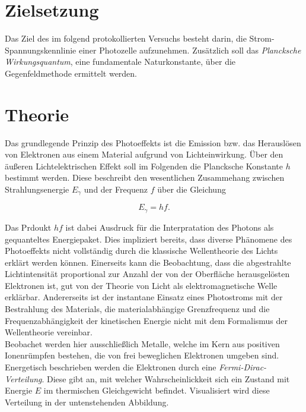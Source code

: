 



\section{Zielsetzung}
\label{sec:Zielsetzung}

Das Ziel des im folgend protokollierten Versuchs besteht darin, die Strom- Spannungskennlinie einer Photozelle aufzunehmen. Zusätzlich soll das \emph{Plancksche
Wirkungsquantum}, eine fundamentale Naturkonstante, über die Gegenfeldmethode ermittelt werden.

\section{Theorie}
\label{sec:Theorie}

Das grundlegende Prinzip des Photoeffekts ist die Emission bzw. das Herauslösen von Elektronen aus einem Material aufgrund von Lichteinwirkung. Über den äußeren 
Lichtelektrischen Effekt soll im Folgenden die Plancksche Konstante $h$ bestimmt werden. Diese beschreibt den wesentlichen Zusammehang zwischen Strahlungsenergie
$E_\gamma$ und der Frequenz $f$ über die Gleichung 

\begin{equation*}
    E_\gamma = hf.
\end{equation*}

\noindent Das Prdoukt $hf$ ist dabei Ausdruck für die Interpratation des Photons als gequanteltes Energiepaket. Dies impliziert bereits, dass diverse Phänomene des 
Photoeffekts nicht vollständig durch die klassische Wellentheorie des Lichts erklärt werden können. Einerseits kann die Beobachtung, dass die abgestrahlte Lichtintensität 
proportional zur Anzahl der von der Oberfläche herausgelösten Elektronen ist, gut von der Theorie von Licht als elektromagnetische Welle erklärbar. 
Andererseits ist der instantane Einsatz eines Photostroms mit der Bestrahlung des Materials, die materialabhängige Grenzfrequenz und die Frequenzabhängigkeit der 
kinetischen Energie nicht mit dem Formalismus der Wellentheorie vereinbar.\\

\noindent Beobachet werden hier ausschließlich Metalle, welche im Kern aus positiven Ionenrümpfen bestehen, die von frei beweglichen Elektronen umgeben sind. Energetisch
beschrieben werden die Elektronen durch eine \emph{Fermi-Dirac-Verteilung}. Diese gibt an, mit welcher Wahrscheinlickkeit sich ein Zustand mit Energie $E$ im thermischen 
Gleichgewicht befindet. Visualisiert wird diese Verteilung in der untenstehenden Abbildung.

